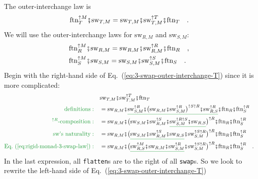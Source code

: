 The outer-interchange law is
\begin{equation}
\text{ftn}_{T}^{\uparrow M}\bef\text{sw}_{T,M}=\text{sw}_{T,M}\bef\text{sw}_{T,M}^{\uparrow T}\bef\text{ftn}_{T}\quad.\label{eq:3-swap-outer-interchange-T}
\end{equation}
We will use the outer-interchange laws for $\text{sw}_{R,M}$ and
$\text{sw}_{S,M}$:
\begin{align}
 & \text{ftn}_{R}^{\uparrow M}\bef\text{sw}_{R,M}=\text{sw}_{R,M}\bef\text{sw}_{R,M}^{\uparrow R}\bef\text{ftn}_{R}\quad,\label{eq:3-swap-outer-interchange-R}\\
 & \text{ftn}_{S}^{\uparrow M}\bef\text{sw}_{S,M}=\text{sw}_{S,M}\bef\text{sw}_{S,M}^{\uparrow S}\bef\text{ftn}_{S}\quad.\label{eq:3-swap-outer-interchange-S}
\end{align}
Begin with the right-hand side of Eq.~(\ref{eq:3-swap-outer-interchange-T})
since it is more complicated:
\begin{align*}
 & \text{sw}_{T,M}\bef\text{sw}_{T,M}^{\uparrow T}\bef\text{ftn}_{T}\\
{\color{greenunder}\text{definitions}:}\quad & =\text{sw}_{R,M}\bef\gunderline{\text{sw}_{S,M}^{\uparrow R}\bef\big(\text{sw}_{R,M}\bef\text{sw}_{S,M}^{\uparrow R}\big)^{\uparrow S\uparrow R}\bef\text{sw}_{R,S}^{\uparrow R}}\bef\text{ftn}_{R}\bef\text{ftn}_{S}^{\uparrow R}\\
{\color{greenunder}^{\uparrow R}\text{-composition}:}\quad & =\text{sw}_{R,M}\bef\big(\text{sw}_{S,M}\bef\text{sw}_{R,M}^{\uparrow S}\bef\gunderline{\text{sw}_{S,M}^{\uparrow R\uparrow S}\bef\text{sw}_{R,S}}\big)^{\uparrow R}\bef\text{ftn}_{R}\bef\text{ftn}_{S}^{\uparrow R}\\
{\color{greenunder}\text{sw's naturality}:}\quad & =\text{sw}_{R,M}\bef\big(\gunderline{\text{sw}_{S,M}\bef\text{sw}_{R,M}^{\uparrow S}\bef\text{sw}_{R,S}}\bef\text{sw}_{S,M}^{\uparrow S\uparrow R}\big)^{\uparrow R}\bef\text{ftn}_{R}\bef\text{ftn}_{S}^{\uparrow R}\\
{\color{greenunder}\text{Eq.~(\ref{eq:rigid-monad-3-swap-law})}:}\quad & =\text{sw}_{R,M}\bef\big(\gunderline{\text{sw}_{R,S}^{\uparrow M}\bef\text{sw}_{R,M}\bef\text{sw}_{S,M}^{\uparrow R}}\bef\text{sw}_{S,M}^{\uparrow S\uparrow R}\big)^{\uparrow R}\bef\text{ftn}_{R}\bef\text{ftn}_{S}^{\uparrow R}\quad.
\end{align*}
In the last expression, all \lstinline!flatten!s
are to the right of all \lstinline!swap!s.
So we look to rewrite the left-hand side of Eq.~(\ref{eq:3-swap-outer-interchange-T})
